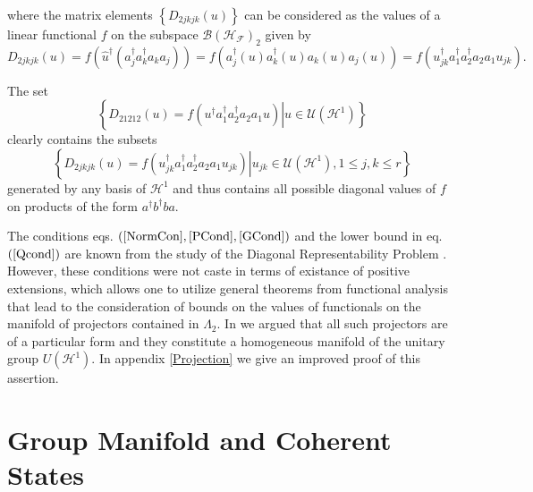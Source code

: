 \documentclass[aps,preprint]{revtex4}%
\begin{document}
where the matrix elements $\left\{  D_{2jkjk}\left(  u\right)  \right\}  $ can
be considered as the values of a linear functional $f$ on the subspace
$\mathcal{B}\left(  \mathcal{H}_{\mathcal{F}}\right)  _{2}$ given by
\begin{equation}
D_{2jkjk}\left(  u\right)  =f\left(  \widehat{u}^{\dagger}\left(
a_{j}^{\dagger}a_{k}^{\dagger}a_{k}a_{j}\right)  \right)  =f\left(
a_{j}^{\dagger}\left(  u\right)  a_{k}^{\dagger}\left(  u\right)  a_{k}\left(
u\right)  a_{j}\left(  u\right)  \right)  =f\left(  u_{jk}^{\dagger}%
a_{1}^{\dagger}a_{2}^{\dagger}a_{2}a_{1}u_{jk}\right)  . \label{matel}%
\end{equation}


The set
\begin{equation}
\left\{  \left.  D_{21212}\left(  u\right)  =f\left(  u^{\dagger}%
a_{1}^{\dagger}a_{2}^{\dagger}a_{2}a_{1}u\right)  \right\vert u\in
\mathcal{U}\left(  \mathcal{H}^{1}\right)  \right\}  \label{allmat}%
\end{equation}
clearly contains the subsets
\begin{equation}
\left\{  \left.  D_{2jkjk}\left(  u\right)  =f\left(  u_{jk}^{\dagger}%
a_{1}^{\dagger}a_{2}^{\dagger}a_{2}a_{1}u_{jk}\right)  \right\vert u_{jk}%
\in\mathcal{U}\left(  \mathcal{H}^{1}\right)  ,1\leq j,k\leq r\right\}
\label{subset}%
\end{equation}
generated by any basis of $\mathcal{H}^{1}$ and thus contains all possible
diagonal values of $f$ on products of the form $a^{\dagger}b^{\dagger}ba.$

The conditions eqs. $\left(  \ref{NormCon},\ref{PCond},\ref{GCond}\right)  $
and the lower bound in eq. $\left(  \ref{Qcond}\right)  $ are known from the
study of the Diagonal Representability Problem
\cite{DavidsonI,DavidsonII,DavidsonIII,WeinholdWilson,Erdahl78}. However,
these conditions were not caste in terms of existance of positive extensions,
which allows one to utilize general theorems from functional analysis that
lead to the consideration of bounds on the values of functionals on the
manifold of projectors contained in $\Lambda_{2}.$ In \cite{weiner2011} we
argued that all such projectors are of a particular form and they constitute a
homogeneous manifold of the unitary group $U\left(  \mathcal{H}^{1}\right)  .$
In appendix \ref{Projection} we give an improved proof of this assertion.

\section{Group Manifold and Coherent States}
\end{document}
